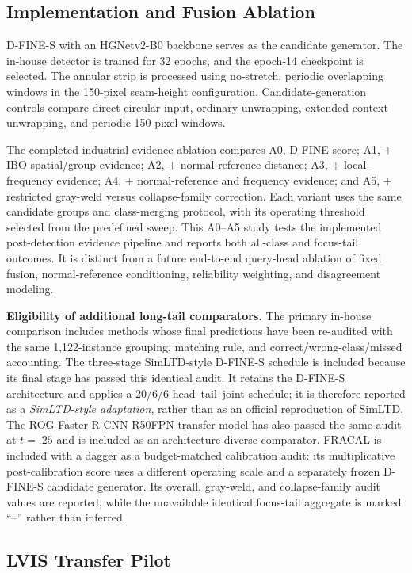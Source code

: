 \subsection{Implementation and Fusion Ablation}

D-FINE-S with an HGNetv2-B0 backbone serves as the candidate generator. The in-house detector is trained for 32 epochs, and the epoch-14 checkpoint is selected. The annular strip is processed using no-stretch, periodic overlapping windows in the 150-pixel seam-height configuration. Candidate-generation controls compare direct circular input, ordinary unwrapping, extended-context unwrapping, and periodic 150-pixel windows.

The completed industrial evidence ablation compares A0, D-FINE score; A1, $+$ IBO spatial/group evidence; A2, $+$ normal-reference distance; A3, $+$ local-frequency evidence; A4, $+$ normal-reference and frequency evidence; and A5, $+$ restricted gray-weld versus collapse-family correction. Each variant uses the same candidate groups and class-merging protocol, with its operating threshold selected from the predefined sweep. This A0--A5 study tests the implemented post-detection evidence pipeline and reports both all-class and focus-tail outcomes. It is distinct from a future end-to-end query-head ablation of fixed fusion, normal-reference conditioning, reliability weighting, and disagreement modeling.

\noindent\textbf{Eligibility of additional long-tail comparators.} The primary in-house comparison includes methods whose final predictions have been re-audited with the same 1,122-instance grouping, matching rule, and correct/wrong-class/missed accounting. The three-stage SimLTD-style D-FINE-S schedule is included because its final stage has passed this identical audit. It retains the D-FINE-S architecture and applies a 20/6/6 head--tail--joint schedule; it is therefore reported as a \emph{SimLTD-style adaptation}, rather than as an official reproduction of SimLTD. The ROG Faster R-CNN R50FPN transfer model has also passed the same audit at $t=.25$ and is included as an architecture-diverse comparator. FRACAL is included with a dagger as a budget-matched calibration audit: its multiplicative post-calibration score uses a different operating scale and a separately frozen D-FINE-S candidate generator. Its overall, gray-weld, and collapse-family audit values are reported, while the unavailable identical focus-tail aggregate is marked ``--'' rather than inferred.
\subsection{LVIS Transfer Pilot}

